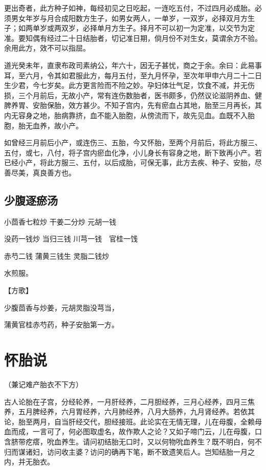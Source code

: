\documentclass[a4paper,12pt,UTF8,twoside]{ctexbook}
\begin{document}
	更出奇者，此方种子如神，每经初见之日吃起，一连吃五付，不过四月必成胎。必须男女年岁与月合成阳数方生子，如男女两人，一单岁，一双岁，必择双月方生子；如两单岁或两双岁，必择单月方生子。择月不可以初一为定准，以交节为定准。要知偶有经过二十日结胎者，切记准日期，倘月份不对生女，莫谓余方不验。余用此方，效不可以指屈。
	
	道光癸未年，直隶布政司素纳公，年六十，因无子甚忧，商之于余。余曰：此易事耳，至六月，令其如君服此方，每月五付，至九月怀孕，至次年甲申六月二十二日生少君，今七岁矣。此方更言险而不险之妙。孕妇体壮气足，饮食不减，并无伤损，三个月前后，无故小产，常有连伤数胎者，医书颇多，仍然议论滋阴养血、健脾养胃、安胎保胎，效方甚少。不知子宫内，先有瘀血占其地，胎至三月再长，其内无容身之地，胎病靠挤，血不能入胎胞，从傍流而下，故先见血。血既不入胎胞，胎无血养，故小产。
	
	如曾经三月前后小产，或连伤三、五胎，今又怀胎，至两个月前后，将此方服三、五付，或七，八付，将子宫内瘀血化净，小儿身长有容身之地，断下致再小产。若已经小产，将此方服三、五付，以后成胎，可保无事，此方去疾、种子、安胎，尽善尽美，真良善方也。
	
	\section{少腹逐瘀汤}
	
	
	小茴香七粒炒 干姜二分炒 元胡一钱
	
	没药一钱炒 当归三钱 川芎一钱　官桂一饯
	
	赤芍二钱 蒲黄三钱生 灵脂二钱炒
	
	水煎服。
	
	【方歌】
	
	少腹茴香与炒姜，元胡灵脂没芎当，
	
	蒲黄官桂赤芍药，种子安胎第一方。
	
	\chapter{怀胎说}
	
	
	（兼记难产胎衣不下方）
	
	古人论胎在子宫，分经轮养，一月肝经养，二月胆经养，三月心经养，四月三焦养，五月脾经养，六月胃经养，六月肺经养，八月大肠养，九月肾经养。若依其论，胎至两月，自当肝经交代，胆经接班。此论实在无情无理，儿在母腹，全赖母血而成，一言可了，何必图取虚名，故作欺人之论？又如子啼门云，儿在母腹，口含脐带疙瘩，吮血养生。请问初结胎无口时，又以何物吮血养生？既不明白，何不归而谋诸妇，访问收主婆？访问的确再下笔，断不致遗笑后人。岂知结胎一月之内，并无胎衣。
	
\end{document}
